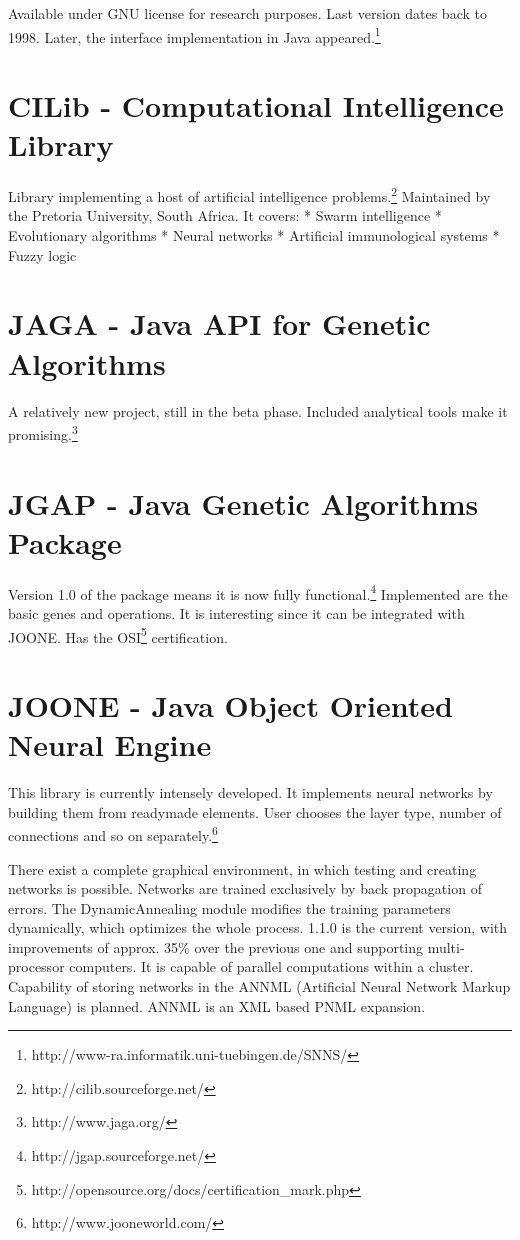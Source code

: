 \documentclass[10pt,oneside]{memoir}
\begin{document}
Available under GNU license for research purposes. Last version dates back to 1998. Later, the interface implementation in Java appeared.\footnote{http://www-ra.informatik.uni-tuebingen.de/SNNS/}


\section{CILib - Computational Intelligence Library}
\label{cilib-computationalintelligencelibrary}

Library implementing a host of artificial intelligence problems.\footnote{http://cilib.sourceforge.net/} Maintained by the Pretoria University, South Africa. It covers:
* Swarm intelligence
* Evolutionary algorithms
* Neural networks
* Artificial immunological systems
* Fuzzy logic


\section{JAGA - Java API for Genetic Algorithms}
\label{jaga-javaapiforgeneticalgorithms}

A relatively new project, still in the beta phase. Included analytical tools make it promising.\footnote{http://www.jaga.org/}


\section{JGAP - Java Genetic Algorithms Package}
\label{jgap-javageneticalgorithmspackage}

Version 1.0 of the package means it is now fully functional.\footnote{http://jgap.sourceforge.net/} Implemented are the basic genes and operations. It is interesting since it can be integrated with JOONE. Has the OSI\footnote{http://opensource.org/docs/certification\_mark.php} certification.


\section{JOONE - Java Object Oriented Neural Engine}
\label{joone-javaobjectorientedneuralengine}

This library is currently intensely developed. It implements neural networks by building them from readymade elements. User chooses the layer type, number of connections and so on separately.\footnote{http://www.jooneworld.com/}


There exist a complete graphical environment, in which testing and creating networks is possible. Networks are trained exclusively by back propagation of errors. The DynamicAnnealing module modifies the training parameters dynamically, which optimizes the whole process. 1.1.0 is the current version, with improvements of approx. 35\% over the previous one and supporting multi-processor computers. It is capable of parallel computations within a cluster. Capability of storing networks in the ANNML (Artificial Neural Network Markup Language) is planned. ANNML is an XML based PNML expansion.
\end{document}
